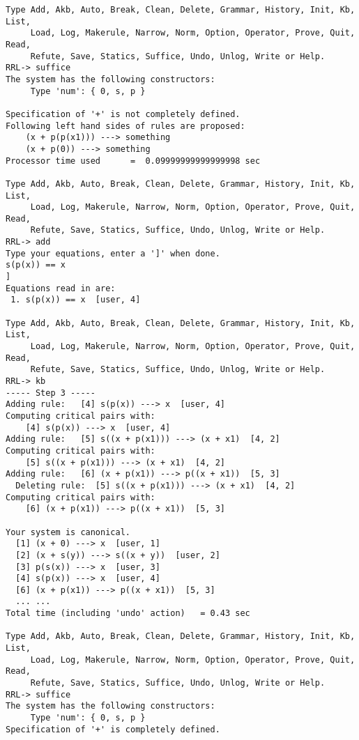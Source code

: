 \begin{verbatim}
Type Add, Akb, Auto, Break, Clean, Delete, Grammar, History, Init, Kb, List,
     Load, Log, Makerule, Narrow, Norm, Option, Operator, Prove, Quit, Read,
     Refute, Save, Statics, Suffice, Undo, Unlog, Write or Help.
RRL-> suffice
The system has the following constructors:
     Type 'num': { 0, s, p }

Specification of '+' is not completely defined.
Following left hand sides of rules are proposed: 
    (x + p(p(x1))) ---> something
    (x + p(0)) ---> something
Processor time used      =  0.09999999999999998 sec

Type Add, Akb, Auto, Break, Clean, Delete, Grammar, History, Init, Kb, List,
     Load, Log, Makerule, Narrow, Norm, Option, Operator, Prove, Quit, Read,
     Refute, Save, Statics, Suffice, Undo, Unlog, Write or Help.
RRL-> add
Type your equations, enter a ']' when done.
s(p(x)) == x
]
Equations read in are:
 1. s(p(x)) == x  [user, 4]

Type Add, Akb, Auto, Break, Clean, Delete, Grammar, History, Init, Kb, List,
     Load, Log, Makerule, Narrow, Norm, Option, Operator, Prove, Quit, Read,
     Refute, Save, Statics, Suffice, Undo, Unlog, Write or Help.
RRL-> kb
----- Step 3 -----
Adding rule:   [4] s(p(x)) ---> x  [user, 4]
Computing critical pairs with: 
    [4] s(p(x)) ---> x  [user, 4]
Adding rule:   [5] s((x + p(x1))) ---> (x + x1)  [4, 2]
Computing critical pairs with: 
    [5] s((x + p(x1))) ---> (x + x1)  [4, 2]
Adding rule:   [6] (x + p(x1)) ---> p((x + x1))  [5, 3]
  Deleting rule:  [5] s((x + p(x1))) ---> (x + x1)  [4, 2]
Computing critical pairs with: 
    [6] (x + p(x1)) ---> p((x + x1))  [5, 3]

Your system is canonical.
  [1] (x + 0) ---> x  [user, 1]
  [2] (x + s(y)) ---> s((x + y))  [user, 2]
  [3] p(s(x)) ---> x  [user, 3]
  [4] s(p(x)) ---> x  [user, 4]
  [6] (x + p(x1)) ---> p((x + x1))  [5, 3]
  ... ...
Total time (including 'undo' action)   = 0.43 sec

Type Add, Akb, Auto, Break, Clean, Delete, Grammar, History, Init, Kb, List,
     Load, Log, Makerule, Narrow, Norm, Option, Operator, Prove, Quit, Read,
     Refute, Save, Statics, Suffice, Undo, Unlog, Write or Help.
RRL-> suffice
The system has the following constructors:
     Type 'num': { 0, s, p }
Specification of '+' is completely defined.
\end{verbatim}
\rm
\normalsize
